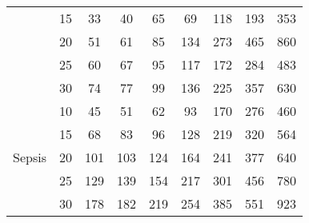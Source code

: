 \begin{table}[]
{\begin{tabular}{|c|c|ccccccc|}
&15                                                           & 33 & 40 & 65 & 69 & 118 & 193 & 353   \\
&20                                                           & 51 & 61 & 85 & 134 & 273 & 465 & 860  \\
&25                                                           & 60  & 67 & 95 & 117 & 172 & 284 & 483  \\
&30                                                           & 74 &  77 &  99 & 136 & 225 & 357 & 630  \\
\hline
\hline
\multirow{5}{*}{Sepsis}&10                                    & 45  & 51  & 62  & 93 & 170 & 276 & 460  \\
&15                                                           & 68 & 83 & 96 & 128 & 219 & 320 & 564   \\
&20                                                           & 101 & 103 & 124 & 164 & 241 & 377 & 640  \\
&25                                                           & 129  & 139 & 154 & 217 & 301 & 456 & 780  \\
&30                                                           & 178 &  182 & 219 & 254 & 385 & 551 & 923  \\
\hline
\end{tabular}
}
\end{table}

